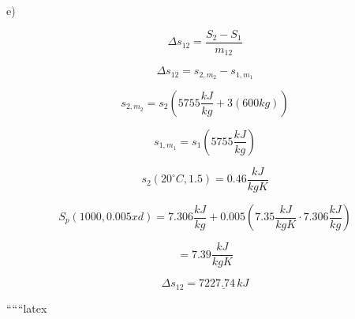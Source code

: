 e)

\[
\Delta s_{12} = \frac{S_2 - S_1}{m_{12}}
\]

\[
\Delta s_{12} = s_{2,m_2} - s_{1,m_1}
\]

\[
s_{2,m_2} = s_2(5755 \frac{kJ}{kg} + 3(600kg))
\]

\[
s_{1,m_1} = s_1(5755 \frac{kJ}{kg})
\]

\[
s_2(20^\circ C, 1.5) = 0.46 \frac{kJ}{kgK}
\]

\[
S_p(1000, 0.005xd) = 7.306 \frac{kJ}{kg} + 0.005(7.35 \frac{kJ}{kgK} \cdot 7.306 \frac{kJ}{kg})
\]

\[
= 7.39 \frac{kJ}{kgK}
\]

\[
\Delta s_{12} = \underline{7227.74 \, kJ}
\]

``````latex